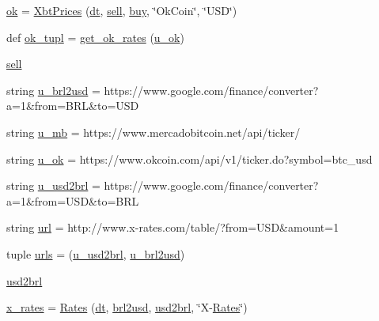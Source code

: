 \begin{DoxyCompactItemize}
\item 
\hyperlink{namespaceraw__urlparser_aa0dcadbc04ec5d09f7a2dabb865000c8}{ok} = \hyperlink{classraw__urlparser_1_1_xbt_prices}{Xbt\+Prices} (\hyperlink{namespaceraw__urlparser_acbaf2eef75f4aa43e1f6659c0fd34836}{dt}, \hyperlink{namespaceraw__urlparser_a9f1ba2a5cd520bb41ac4bee751047679}{sell}, \hyperlink{namespaceraw__urlparser_a2b9c66c8d5157cd95ecb738719c8a873}{buy}, \char`\"{}Ok\+Coin\char`\"{}, \char`\"{}U\+SD\char`\"{})
\item 
def \hyperlink{namespaceraw__urlparser_a470f476a37f64adb24b58db300e57117}{ok\+\_\+tupl} = \hyperlink{namespaceraw__urlparser_aaf342c097e3df48d46b7296e8177d737}{get\+\_\+ok\+\_\+rates} (\hyperlink{namespaceraw__urlparser_a22c1a17803a88426d38d70ad6d4290d2}{u\+\_\+ok})
\item 
\hyperlink{namespaceraw__urlparser_a9f1ba2a5cd520bb41ac4bee751047679}{sell}
\item 
string \hyperlink{namespaceraw__urlparser_a876711ddd7ebb3991a35cc1768d1d22c}{u\+\_\+brl2usd} = \textquotesingle{}https\+://www.\+google.\+com/finance/converter?a=1\&from=B\+RL\&to=U\+SD\textquotesingle{}
\item 
string \hyperlink{namespaceraw__urlparser_a9a840f174b92a24c415b88c87e84b73d}{u\+\_\+mb} = \textquotesingle{}https\+://www.\+mercadobitcoin.\+net/api/ticker/\textquotesingle{}
\item 
string \hyperlink{namespaceraw__urlparser_a22c1a17803a88426d38d70ad6d4290d2}{u\+\_\+ok} = \textquotesingle{}https\+://www.\+okcoin.\+com/api/v1/ticker.\+do?symbol=btc\+\_\+usd\textquotesingle{}
\item 
string \hyperlink{namespaceraw__urlparser_a63e1f0abe7b1f43c4891ce9aec98261d}{u\+\_\+usd2brl} = \textquotesingle{}https\+://www.\+google.\+com/finance/converter?a=1\&from=U\+SD\&to=B\+RL\textquotesingle{}
\item 
string \hyperlink{namespaceraw__urlparser_a9242b893f4f49ef7cc0d4e599b70daa4}{url} = \textquotesingle{}http\+://www.\+x-\/rates.\+com/table/?from=U\+SD\&amount=1\textquotesingle{}
\item 
tuple \hyperlink{namespaceraw__urlparser_aded92a1146e1ce1f14fd79a361f947f9}{urls} = (\hyperlink{namespaceraw__urlparser_a63e1f0abe7b1f43c4891ce9aec98261d}{u\+\_\+usd2brl}, \hyperlink{namespaceraw__urlparser_a876711ddd7ebb3991a35cc1768d1d22c}{u\+\_\+brl2usd})
\item 
\hyperlink{namespaceraw__urlparser_adb724d2d0b7c561e8b0c53a42831efce}{usd2brl}
\item 
\hyperlink{namespaceraw__urlparser_a76bac0500149c0b7dc5e8dfef56f05c3}{x\+\_\+rates} = \hyperlink{classraw__urlparser_1_1_rates}{Rates} (\hyperlink{namespaceraw__urlparser_acbaf2eef75f4aa43e1f6659c0fd34836}{dt}, \hyperlink{namespaceraw__urlparser_ae7e1c02df9ab0102e017e31885aa6431}{brl2usd}, \hyperlink{namespaceraw__urlparser_adb724d2d0b7c561e8b0c53a42831efce}{usd2brl}, \char`\"{}X-\/\hyperlink{classraw__urlparser_1_1_rates}{Rates}\char`\"{})
\end{DoxyCompactItemize}


